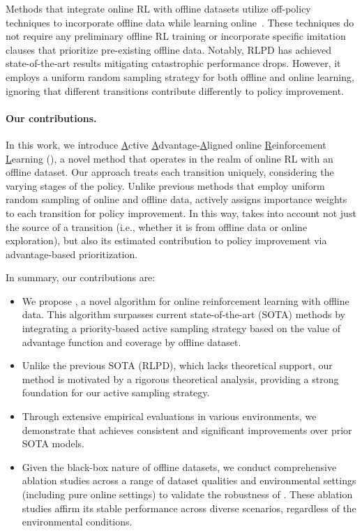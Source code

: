 Methods that integrate online RL with offline datasets utilize off-policy techniques to incorporate offline data while learning online~\citep{song2022hybrid,ball2023efficient}. 
These techniques do not require any preliminary offline RL training or incorporate specific imitation clauses that prioritize pre-existing offline data. Notably, RLPD \citep{ball2023efficient} has achieved state-of-the-art results mitigating catastrophic performance drops. %
However, it employs a uniform random sampling strategy for both offline and online learning, ignoring that different transitions contribute differently to policy improvement. %

\paragraph{Our contributions.} 
In this work, we introduce \underline{A}ctive \underline{A}dvantage-\underline{A}ligned  online \underline{R}einforcement \underline{L}earning (\algname),
a novel method that operates in the realm of online RL with an offline dataset. Our approach treats each transition uniquely, considering the varying stages of the policy.
Unlike previous methods that employ uniform random sampling of online and offline data, \algname actively assigns importance weights to each transition for policy improvement. %
In this way, \algname takes into account not just the source of a transition (i.e., whether it is from offline data or online exploration), but also its estimated contribution to policy improvement via advantage-based prioritization.


In summary, our contributions are:
\vspace{-10pt} %
\begin{itemize}[noitemsep,wide,labelwidth=0pt, labelindent=0pt]
    \item We propose \algname, a novel algorithm for online reinforcement learning with offline data. This algorithm surpasses current state-of-the-art (SOTA) methods by integrating a priority-based 
    active sampling strategy
    based on the value of advantage function and coverage by offline dataset.
    \item Unlike the previous SOTA (RLPD), which lacks theoretical support, %
    our method is motivated by a rigorous theoretical analysis, providing a strong foundation for our active sampling strategy.
    \item Through extensive empirical evaluations in various environments, we demonstrate that \algname achieves %
    consistent and significant improvements over prior SOTA models.
    \item Given the black-box nature of offline datasets, we conduct comprehensive ablation studies across a range of dataset qualities and environmental settings (including pure online settings) to validate the robustness of \algname. These ablation studies affirm its stable performance across diverse scenarios, regardless of the environmental conditions.
\end{itemize}





